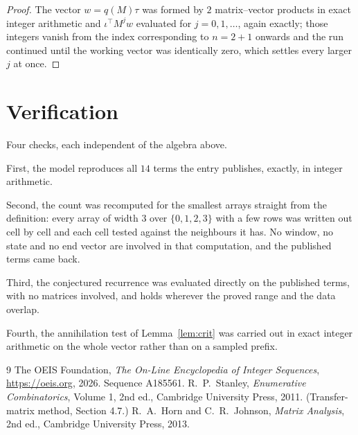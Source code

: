 \documentclass[11pt,a4paper]{article}
\theoremstyle{plain}
\theoremstyle{definition}
\begin{document}
\begin{proof}
The vector $w=q(M)\tau$ was formed by $2$ matrix--vector products in exact integer
arithmetic and $\iota^{\!\top}M^{j}w$ evaluated for $j=0,1,\dots$, again exactly; those
integers vanish from the index corresponding to $n=2+1$ onwards and the run continued
until the working vector was identically zero, which settles every larger $j$ at once.
\end{proof}

\section{Verification}

Four checks, each independent of the algebra above.

First, the model reproduces all $14$ terms the entry publishes, exactly, in integer
arithmetic.

Second, the count was recomputed for the smallest arrays straight from the definition: every
array of width $3$ over $\{0,1,2,3\}$ with a few rows was written out cell by cell and each cell
tested against the neighbours it has. No window, no state and no end vector are involved in that
computation, and the published terms came back.

Third, the conjectured recurrence was evaluated directly on the published terms, with no
matrices involved, and holds wherever the proved range and the data overlap.

Fourth, the annihilation test of Lemma~\ref{lem:crit} was carried out in exact integer
arithmetic on the whole vector rather than on a sampled prefix.

\begin{thebibliography}{9}
 The OEIS Foundation, \emph{The On-Line Encyclopedia of Integer
Sequences}, \url{https://oeis.org}, 2026. Sequence A185561.
 R.~P.~Stanley, \emph{Enumerative Combinatorics}, Volume 1, 2nd ed.,
Cambridge University Press, 2011. (Transfer-matrix method, Section 4.7.)
 R.~A.~Horn and C.~R.~Johnson, \emph{Matrix Analysis}, 2nd ed., Cambridge
University Press, 2013.
\end{thebibliography}
\end{document}
